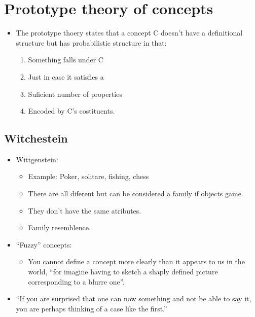 \section{Prototype theory of concepts}
\begin{itemize}
    \item The prototype thoery states that a concept C doesn't have a definitional structure but has probabilistic structure in that:
        \begin{enumerate}
            \item Something falls under C 
            \item Just in case it satisfies a 
            \item Suficient number of properties 
            \item Encoded by C's costituents.
        \end{enumerate}
\end{itemize}

\subsection{Witchestein}        
\begin{itemize}
    \item Wittgenstein: 
        \begin{itemize}
            \item Example: Poker, solitare, fishing, chess
            \item There are all diferent but can be considered a family if objects game.
            \item They don't have the same atributes.
            \item Family resemblence.
        \end{itemize}
    
    \item ``Fuzzy'' concepts:
        \begin{itemize}
            \item You cannot define a concept more clearly than it appears to us in the world, ``for imagine having to sketch a shaply defined picture corresponding to a blurre one''.
        \end{itemize}
    
        
    \item ``If you are surprised that one can now something and not be able to say it, you are perhaps thinking of a case like the first.''
\end{itemize}


